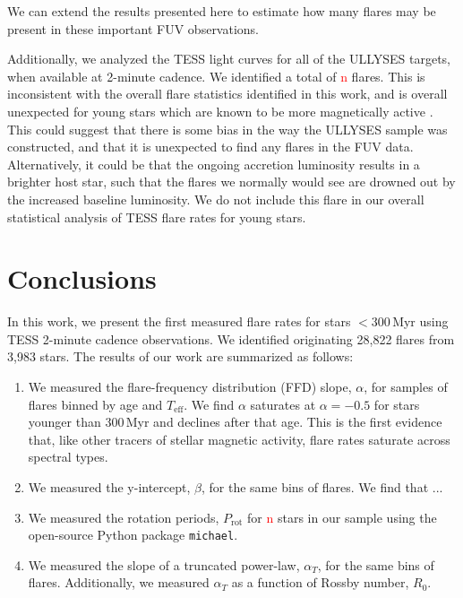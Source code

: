 \documentclass[twocolumn]{aastex631}
\begin{document}
We can extend the results presented here to estimate how many flares may be present
in these important FUV observations.

Additionally, we analyzed the TESS light curves for all of the ULLYSES targets, when
available at 2-minute cadence. We identified a total of \textcolor{red}{n} flares.
This is inconsistent with the overall flare statistics identified in this work, and is
overall unexpected for young stars which are known to be more magnetically active
\citep{ilin20, feinstein20}. This could suggest that there is some bias in the way
the ULLYSES sample was constructed, and that it is unexpected to find any flares in the
FUV data. Alternatively, it could be that the ongoing accretion luminosity results
in a brighter host star, such that the flares we normally would see are drowned
out by the increased baseline luminosity. We do not include this flare in our
overall statistical analysis of TESS flare rates for young stars.


\section{Conclusions}\label{sec:conclusions}

In this work, we present the first measured flare rates for stars $< 300$\,Myr using
TESS 2-minute cadence observations. We identified originating 28,822 flares from
3,983 stars. The results of our work are summarized as follows:

\begin{enumerate}
  \item We measured the flare-frequency distribution (FFD) slope, $\alpha$, for samples
  of flares binned by age and $T_\textrm{eff}$. We find $\alpha$ saturates at
  $\alpha = -0.5$ for stars younger than 300\,Myr and declines after that age.
  This is the first evidence that, like other tracers of stellar magnetic activity,
  flare rates saturate across spectral types.
  \item We measured the y-intercept, $\beta$, for the same bins of flares. We find
  that ...
  \item We measured the rotation periods, $P_\textrm{rot}$ for \textcolor{red}{n}
  stars in our sample using the open-source Python package \texttt{michael}.
  \item We measured the slope of a truncated power-law, $\alpha_T$, for the same
  bins of flares. Additionally, we measured $\alpha_T$ as a function of Rossby
  number, $R_0$.
\end{enumerate}
\end{document}
